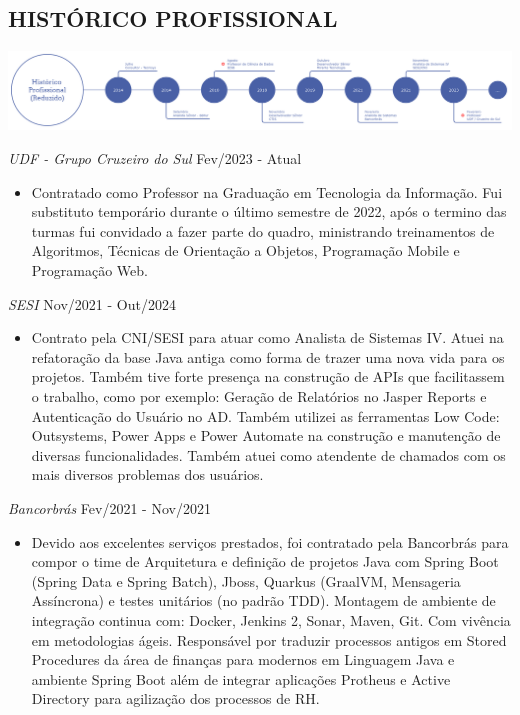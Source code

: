 \documentclass{res}
\begin{document}
\begin{resume}
		\section{HISTÓRICO PROFISSIONAL} %
		\vspace{8pt}
		\includegraphics[width=1.0\textwidth]{imagens/experiencia.png}
		
		{\sl UDF - Grupo Cruzeiro do Sul} \hfill Fev/2023 - Atual
		\begin{itemize}
			\item Contratado como Professor na Graduação em Tecnologia da Informação. Fui substituto temporário durante o último semestre de 2022, após o termino das turmas fui convidado a fazer parte do quadro, ministrando treinamentos de Algoritmos, Técnicas de Orientação a Objetos, Programação Mobile e Programação Web.
		\end{itemize}

		{\sl SESI} \hfill Nov/2021 - Out/2024
		\begin{itemize}
			\item Contrato pela CNI/SESI para atuar como Analista de Sistemas IV. Atuei na refatoração da base Java antiga como forma de trazer uma nova vida para os projetos. Também tive forte presença na construção de APIs que facilitassem o trabalho, como por exemplo: Geração de Relatórios no Jasper Reports e Autenticação do Usuário no AD. Também utilizei as ferramentas Low Code: Outsystems, Power Apps e Power Automate na construção e manutenção de diversas funcionalidades. Também atuei como atendente de chamados com os mais diversos problemas dos usuários.
		\end{itemize}
		
		{\sl Bancorbrás} \hfill Fev/2021 - Nov/2021
		\begin{itemize}
			\item Devido aos excelentes serviços prestados, foi contratado pela Bancorbrás para compor o time de Arquitetura e definição de projetos Java com Spring Boot (Spring Data e Spring Batch), Jboss, Quarkus (GraalVM, Mensageria Assíncrona) e testes unitários (no padrão TDD). Montagem de ambiente de integração continua com: Docker, Jenkins 2, Sonar, Maven, Git. Com vivência em metodologias ágeis. Responsável por traduzir processos antigos em Stored Procedures da área de finanças para modernos em Linguagem Java e ambiente Spring Boot além de integrar aplicações Protheus e Active Directory para agilização dos processos de RH.
		\end{itemize}
		

\end{resume}
\end{document}

